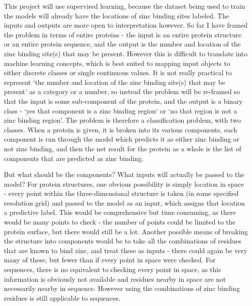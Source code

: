 This project will use supervised learning, because the dataset being used to train the models will already have the locations of zinc binding sites labeled. The inputs and outputs are more open to interpretation however. So far I have framed the problem in terms of entire proteins - the input is an entire protein structure or an entire protein sequence, and the output is the number and location of the zinc binding site(s) that may be present. However this is difficult to translate into machine learning concepts, which is best suited to mapping input objects to either discrete classes or single continuous values. It is not really practical to represent `the number and location of the zinc binding site(s) that may be present' as a category or a number, so instead the problem will be re-framed so that the input is some sub-component of the protein, and the output is a binary class - `yes that component is a zinc binding region` or `no that region is not a zinc binding region'. The problem is therefore a classification problem, with two classes. When a protein is given, it is broken into its various components, each component is run through the model which predicts it as either zinc binding or not zinc binding, and then the net result for the protein as a whole is the list of components that are predicted as zinc binding.

But what should be the components? What inputs will actually be passed to the model? For protein structures, one obvious possibility is simply location in space - every point within the three-dimensional structure is taken (in some specified resolution grid) and passed to the model as an input, which assigns that location a predictive label. This would be comprehensive but time consuming, as there would be many points to check - the number of points could be limited to the protein surface, but there would still be a lot. Another possible means of breaking the structure into components would be to take all the combinations of residues that are known to bind zinc, and treat these as inputs - there could again be very many of these, but fewer than if every point in space were checked. For sequences, there is no equivalent to checking every point in space, as this information is obviously not available and residues nearby in space are not necessarily nearby in sequence. However using the combinations of zinc binding residues is still applicable to sequences.

